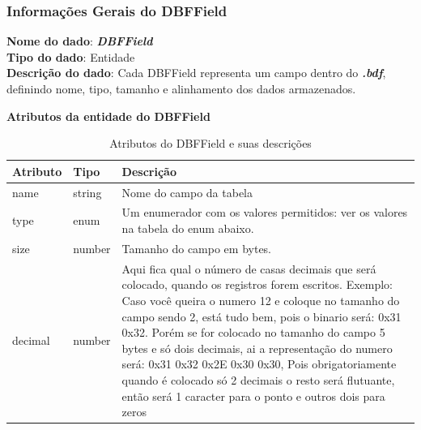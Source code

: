 \subsubsection{Informações Gerais do DBFField}
\textbf{Nome do dado}: \textit{\textbf{DBFField}} \\  
\textbf{Tipo do dado}: Entidade \\  
\textbf{Descrição do dado}: Cada DBFField representa um campo dentro do \textit{\textbf{.bdf}}, definindo nome, tipo, tamanho e alinhamento dos dados armazenados. \\  

\begin{table}[H]
    \centering
    \textbf{Atributos da entidade do DBFField}
    \begin{tabular}{|p{} | p{} | p{}|}
        \hline
        \textbf{Atributo} & \textbf{Tipo} & \textbf{Descrição} \\
        \hline
        name & string & Nome do campo da tabela \\
        \hline
        type & enum &  Um enumerador com os valores permitidos: ver os valores na tabela do enum abaixo. \\
        \hline
        size & number  & Tamanho do campo em bytes. \\
        \hline
        decimal & number  & Aqui fica qual o número de casas decimais que será colocado, quando os registros forem escritos. Exemplo: Caso você queira o numero 12 e coloque no tamanho do campo sendo 2, está tudo bem, pois o binario será: 0x31 0x32. Porém se for colocado no tamanho do campo 5 bytes e só dois decimais, ai a representação do numero será: 0x31 0x32 0x2E 0x30 0x30, Pois obrigatoriamente quando é colocado só 2 decimais o resto será flutuante, então será 1 caracter para o ponto e outros dois para zeros \\
        \hline
    \end{tabular}
    \caption{Atributos do DBFField e suas descrições}
    \label{tab:tabela_atributos_dbffield}
\end{table}


